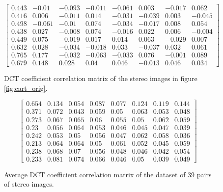 \begin{figure}
    \begin{equation*}
        \left[
        \begin{matrix}
        0.443 & -0.01  & -0.093 & -0.011 & -0.061 &   0.003 & -0.017 &  0.062 \\
        0.416 &  0.006 & -0.011 &  0.014 & -0.031 &  -0.039 &  0.003 & -0.045 \\
        0.498 & -0.061 & -0.01  &  0.074 & -0.034 &  -0.017 &  0.008 &  0.054 \\
        0.438 &  0.027 & -0.008 &  0.074 & -0.016 &   0.022 &  0.006 & -0.004 \\
        0.449 &  0.075 & -0.019 &  0.017 &  0.014 &   0.063 & -0.029 &  0.007 \\
        0.632 &  0.028 & -0.034 & -0.018 &  0.033 &  -0.037 &  0.032 &  0.061 \\
        0.765 &  0.177 & -0.032 & -0.063 & -0.033 &   0.076 & -0.001 &  0.089 \\
        0.679 &  0.148 &  0.028 &  0.04  &  0.046 &  -0.013 &  0.046 &  0.034
        \end{matrix}
        \right]
    \end{equation*}
    \caption{DCT coefficient correlation matrix of the stereo images in figure \ref{fig:cart_orig}.}
\end{figure}

\begin{figure}
    \begin{equation*}
        \left[
        \begin{matrix}
        0.654 & 0.134 & 0.054 & 0.087 & 0.077 & 0.124 & 0.119 & 0.144 \\
        0.371 & 0.072 & 0.043 & 0.059 & 0.05  & 0.063 & 0.053 & 0.048 \\
        0.273 & 0.067 & 0.065 & 0.06  & 0.055 & 0.05  & 0.062 & 0.059 \\
        0.23  & 0.056 & 0.064 & 0.053 & 0.046 & 0.045 & 0.047 & 0.039 \\
        0.242 & 0.053 & 0.05  & 0.056 & 0.047 & 0.062 & 0.058 & 0.036 \\
        0.213 & 0.064 & 0.064 & 0.05  & 0.061 & 0.052 & 0.045 & 0.059 \\
        0.238 & 0.068 & 0.07  & 0.056 & 0.048 & 0.046 & 0.042 & 0.054 \\
        0.233 & 0.081 & 0.074 & 0.066 & 0.046 & 0.05  & 0.039 & 0.049
        \end{matrix}
        \right]
    \end{equation*}
    \caption{Average DCT coefficient correlation matrix of the dataset of 39 pairs of stereo images.}
\end{figure}

